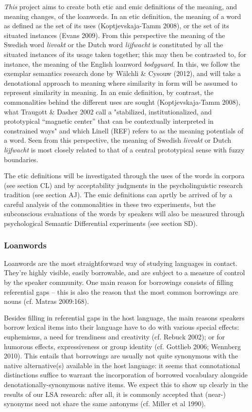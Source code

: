 \documentclass[a4paper]{article}
\begin{document}
\emph{This} project aims to create both etic and emic definitions of the meaning, and meaning changes, of the loanwords. In an etic definition, the meaning of a word as defined as the set of its uses (Koptjevskaja-Tamm 2008), or the set of its situated instances (Evans 2009). From this perspective the meaning of the Swedish word \emph{livvakt} or the Dutch word \emph{lijfwacht} is constituted by all the situated instances of its usage taken together; this may then be contrasted to, for instance, the meaning of the English loanword \emph{bodyguard}. In this, we follow the exemplar semantics research done by W\"alchli \& Cysouw (2012), and will take a denotational approach to meaning where similarity in form will be assumed to represent similarity in meaning. In an emic definition, by contrast, the commonalities behind the different uses are sought (Koptjevskaja-Tamm 2008), what Traugott \& Dasher 2002 call a "stabilized, institutionalized, and prototypical “magnetic center” that can be contextually interpreted in constrained ways" and which Linell (REF) refers to as the meaning potentials of a word. Seen from this perspective, the meaning of Swedish \emph{livvakt} or Dutch \emph{lijfwacht} is most closely related to that of a central prototypical sense with fuzzy boundaries.

The etic definitions will be investigated through the uses of the words in corpora (see section CL) and by acceptability judgments in the psycholinguistic research tradition (see section AJ). The emic definitions can aprtly be arrived of by a careful analysis of the commonalities in these two experiments, but the subconscious evaluations of the words by speakers will also be measured through psychological Semantic Differential experiments (see section SD).




\subsubsection{Loanwords}
Loanwords are the most straightforward way of studying languages in contact. They're highly visible, easily borrowable, and are subject to a measure of control by the speaker community. One main reason for borrowings consists of filling referential gaps -- this is also the reason that the most common borrowings are nouns (cf. Matras 2009:168).

Besides filling in referential gaps in the host language, the main reasons speakers borrow lexical items into their language have to do with various special effects: euphemisms, a need for trendiness and creativity (cf. Rebuck 2002); or for humorous effects, expressiveness or group identity (cf. Gottlieb 2006; Wennberg 2010). This entails that borrowings are usually not quite synonymous with the native alternative(s) available in the host language: it seems that connotational distinctions suffice to warrant the incorporation of borrowed vocabulary alongside denotationally-synonymous native items. We expect this to show up clearly in the results of our LSA research: after all, it is commonly accepted that (near-) synonyms need not share the same antonyms (cf. Miller et al 1990). 
\end{document}
